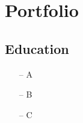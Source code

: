 \chapter*{Portfolio}

\section*{Education}

\begin{itemize}
	\item[--] A
	\item[--] B
	\item[--] C
\end{itemize}
